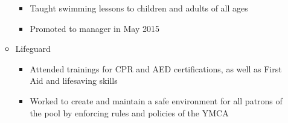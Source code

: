 \begin{enumerate}[label={\Roman*}.]
\begin{itemize}
\begin{itemize}
	      	      	\item Taught swimming lessons to children and adults of all ages
	      	      	\item Promoted to manager in May 2015
	      	      \end{itemize}
	      	\item Lifeguard
	      	      \begin{itemize}
	      	      	\item Attended trainings for CPR and AED certifications, as well as First Aid and lifesaving skills
	      	      	\item Worked to create and maintain a safe environment for all patrons of the pool by enforcing rules and
	      	      	      policies of the YMCA
	      	      \end{itemize}
	      \end{itemize}
\end{enumerate}
